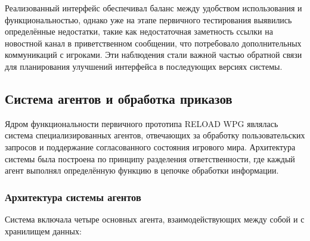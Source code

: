 Реализованный интерфейс обеспечивал баланс между удобством использования и функциональностью, однако уже на этапе первичного тестирования выявились определённые недостатки, такие как недостаточная заметность ссылки на новостной канал в приветственном сообщении, что потребовало дополнительных коммуникаций с игроками. Эти наблюдения стали важной частью обратной связи для планирования улучшений интерфейса в последующих версиях системы.

\subsection{Система агентов и обработка приказов}

Ядром функциональности первичного прототипа RELOAD WPG являлась система специализированных агентов, отвечающих за обработку пользовательских запросов и поддержание согласованного состояния игрового мира. Архитектура системы была построена по принципу разделения ответственности, где каждый агент выполнял определённую функцию в цепочке обработки информации.

\subsubsection{Архитектура системы агентов}

Система включала четыре основных агента, взаимодействующих между собой и с хранилищем данных:

